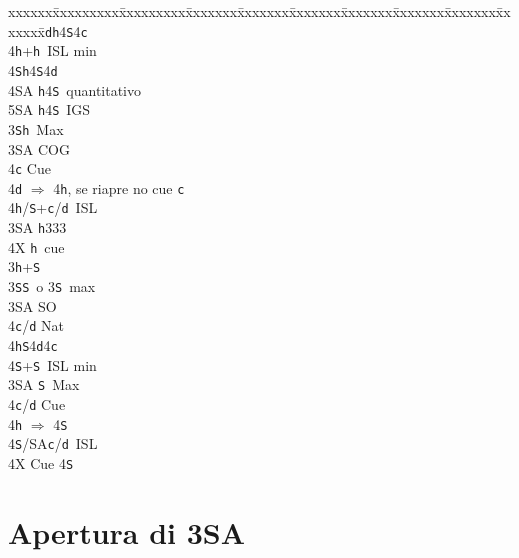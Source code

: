 \documentclass[a4paper,italian]{article}
\newcommand{\BS}{\small{\texttt{S}}}
\newcommand{\BC}{\small{\texttt{c}}}
\newcommand{\BD}{\small{\texttt{d}}}
\newcommand{\BH}{\small{\texttt{h}}}
\newenvironment{bidtable}
{\begin{tabbing}

    xxxxxx\=xxxxxxxxx\=xxxxxxxxx\=xxxxxxx\=xxxxxxx\=xxxxxxx\=xxxxxxx\=xxxxxxx\=xxxxxxx\=xxxxxxx\=\kill}
{\end{tabbing} }%
\begin{document}
\begin{multicols}{2}
\begin{bidtable}
        4\BD {}\BH 4\BS 4\BC \\
        4\BH {}+\BH\ ISL min\\
        4\BS {}\BH 4\BS 4\BD \\
        4\small{SA} \BH 4\BS\ quantitativo\\
        5\small{SA} \BH 4\BS\ IGS\-\\
        3\BS {}\BH\ Max\+\\
        3\small{SA}\> COG\\
        4\BC\> Cue\\
        4\BD\> $\Rightarrow$ 4\BH, se riapre no cue \BC\\
        4\BH/\BS{}+\BC/\BD\ ISL\-\\
        3\small{SA} \BH 333\\
        4X \BH\ cue\-\\
        3\BH {}+\BS \+\\
        3\BS {}\BS\ o 3\BS\ max\+\\
        3\small{SA} \> SO\\
        4\BC/\BD \> Nat\\
        4\BH {}\BS 4\BD 4\BC \\
        4\BS {}+\BS\ ISL min\-\\
        3\small{SA} \BS\ Max\+\\
        4\BC/\BD\> Cue\\
        4\BH\> $\Rightarrow$ 4\BS\\
        4\BS/SA\BC/\BD\ ISL\-\\
        4X \> Cue 4\BS\\
    \end{bidtable}
\end{multicols}

\newpage
\section{Apertura di 3SA}
\end{document}
